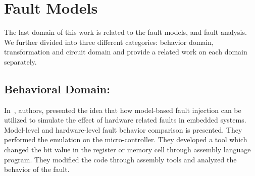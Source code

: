 


\section{Fault Models}


The last domain of this work is related to the fault models, and fault analysis. We further divided into three different categories: behavior domain, transformation and circuit domain and provide a related work on each domain separately.


\subsection{Behavioral Domain:}




In~\citep{svenningsson2010model}, authors, presented the idea that how model-based fault injection can be utilized to
simulate the effect of hardware related faults in embedded systems. Model-level and hardware-level
fault behavior comparison is presented. They performed the emulation on the micro-controller. They developed a tool which changed the bit value in the register or memory cell through assembly language program. They modified the code through assembly tools and analyzed the behavior of the fault.

